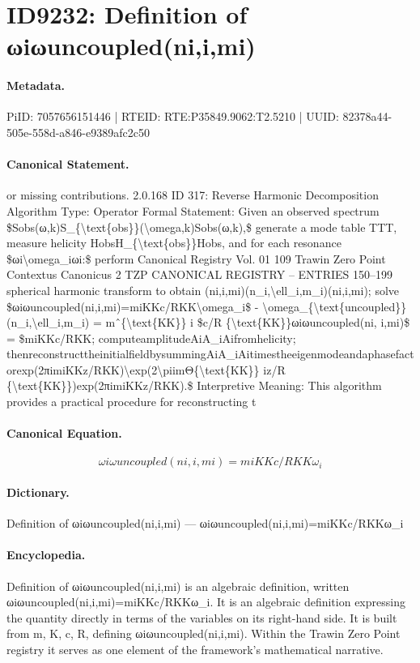 \section*{ID9232: Definition of ωiωuncoupled(ni,i,mi)}
\paragraph{Metadata.}
PiID: 7057656151446 | RTEID: RTE:P35849.9062:T2.5210 | UUID: 82378a44-505e-558d-a846-e9389afc2c50

\paragraph{Canonical Statement.}
or missing contributions. 2.0.168 ID 317: Reverse Harmonic Decomposition Algorithm Type: Operator Formal Statement: Given an observed spectrum \$Sobs(ω,k)S\_\{\textbackslash{}text\{obs\}\}(\textbackslash{}omega,k)Sobs(ω,k),\$ generate a mode table TTT, measure helicity HobsH\_\{\textbackslash{}text\{obs\}\}Hobs, and for each resonance \$ωi\textbackslash{}omega\_iωi:\$ perform Canonical Registry Vol. 01 109 Trawin Zero Point Contextus Canonicus 2 TZP CANONICAL REGISTRY – ENTRIES 150–199 spherical harmonic transform to obtain (ni,i,mi)(n\_i,\textbackslash{}ell\_i,m\_i)(ni,i,mi); solve \$ωiωuncoupled(ni,i,mi)=miKKc/RKK\textbackslash{}omega\_i\$ - \textbackslash{}omega\_\{\textbackslash{}text\{uncoupled\}\}(n\_i,\textbackslash{}ell\_i,m\_i) = mˆ\{\textbackslash{}text\{KK\}\} i \$c/R \{\textbackslash{}text\{KK\}\}ωiωuncoupled(ni, i,mi)\$ = \$miKKc/RKK; computeamplitudeAiA\_iAifromhelicity; thenreconstructtheinitialfieldbysummingAiA\_iAitimestheeigenmodeandaphasefactorexp(2πimiKKz/RKK)\textbackslash{}exp(2\textbackslash{}piimΘ\{\textbackslash{}text\{KK\}\} iz/R \{\textbackslash{}text\{KK\}\})exp(2πimiKKz/RKK).\$ Interpretive Meaning: This algorithm provides a practical procedure for reconstructing t

\paragraph{Canonical Equation.}
\[
ωiωuncoupled(ni,i,mi)=miKKc/RKK\omega_i
\]

\paragraph{Dictionary.}
Definition of ωiωuncoupled(ni,i,mi) — ωiωuncoupled(ni,i,mi)=miKKc/RKKω\_i

\paragraph{Encyclopedia.}
Definition of ωiωuncoupled(ni,i,mi) is an algebraic definition, written ωiωuncoupled(ni,i,mi)=miKKc/RKKω\_i. It is an algebraic definition expressing the quantity directly in terms of the variables on its right-hand side. It is built from m, K, c, R, defining ωiωuncoupled(ni,i,mi). Within the Trawin Zero Point registry it serves as one element of the framework's mathematical narrative.
